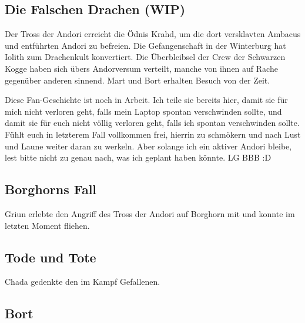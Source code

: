 \begin{chapterbox}
    \chapter{Die Falschen Drachen (WIP)}
    \label{wip-falschen-drachen}

    Der Tross der Andori erreicht die Ödnis Krahd, um die dort versklavten Ambacus und entführten Andori zu befreien. Die Gefangenschaft in der Winterburg hat Iolith zum Drachenkult konvertiert. Die Überbleibsel der Crew der Schwarzen Kogge haben sich übers Andorversum verteilt, manche von ihnen auf Rache gegenüber anderen sinnend. Mart und Bort erhalten Besuch von  der Zeit. 
\end{chapterbox}



Diese Fan-Geschichte ist noch in Arbeit. Ich teile sie bereits hier, damit sie für mich nicht verloren geht, falls mein Laptop spontan verschwinden sollte, und damit sie für euch nicht völlig verloren geht, falls ich spontan verschwinden sollte. Fühlt euch in letzterem Fall vollkommen frei, hierrin zu schmökern und nach Lust und Laune weiter daran zu werkeln. Aber solange ich ein aktiver Andori bleibe, lest bitte nicht zu genau nach, was ich geplant haben könnte. LG BBB :D



\newpage
\section{Borghorns Fall}

Griun erlebte den Angriff des Tross der Andori auf Borghorn mit und konnte im letzten Moment fliehen.






\newpage
\section{Tode und Tote}

Chada gedenkte den im Kampf Gefallenen.







\newpage
\section{Bort}


